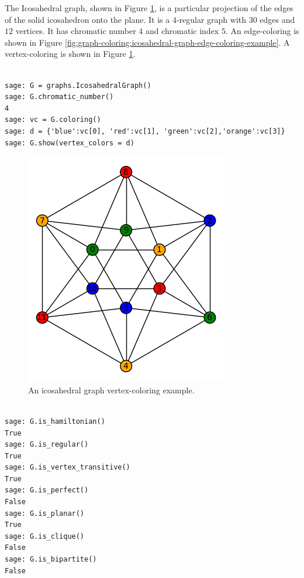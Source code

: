 \begin{example}
\label{example:graph-coloring:icosahedral-graph-vertex-coloring-example}
The Icosahedral graph, shown in Figure 
\ref{fig:graph-coloring:icosahedral-graph-vertex-coloring-example},
is a particular projection of the edges of the solid icosahedron
onto the plane. It is a $4$-regular graph with $30$ edges and $12$ vertices.
It has chromatic number $4$ and chromatic index $5$.
An edge-coloring is shown in Figure
\ref{fig:graph-coloring:icosahedral-graph-edge-coloring-example}.
A vertex-coloring is shown in Figure
\ref{fig:graph-coloring:icosahedral-graph-vertex-coloring-example}.

\begin{verbatim}

sage: G = graphs.IcosahedralGraph()
sage: G.chromatic_number()
4
sage: vc = G.coloring()
sage: d = {'blue':vc[0], 'red':vc[1], 'green':vc[2],'orange':vc[3]}
sage: G.show(vertex_colors = d)

\end{verbatim}

\begin{figure}[!htbp]
\centering
\includegraphics[scale=0.7]{image/graph-coloring/icosahedral-graph-vertex-coloring-example}
\caption{An icosahedral graph vertex-coloring example.}
\label{fig:graph-coloring:icosahedral-graph-vertex-coloring-example}
\end{figure}

\begin{verbatim}

sage: G.is_hamiltonian()
True
sage: G.is_regular()    
True
sage: G.is_vertex_transitive()
True
sage: G.is_perfect()          
False
sage: G.is_planar() 
True
sage: G.is_clique()
False
sage: G.is_bipartite()
False


\end{verbatim}
\end{example}
